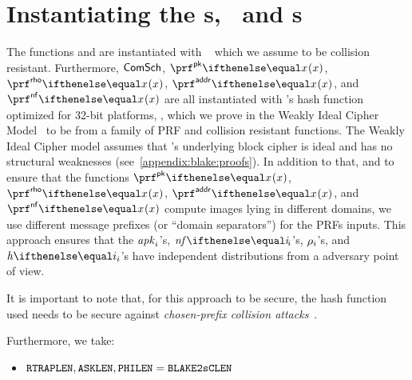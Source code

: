 
\section{Instantiating the \prf{}s, \comm~and \crh{}s}\label{instantiation:prf-comm-crh}


The functions \crhhsig{} and \crhots{} are instantiated with ~\cite{fips1804} which we assume to be collision resistant. Furthermore, $\mathsf{ComSch}$, $\prfpk{}{x}$, $\prfrho{}{x}$, $\prfaddr{}{x}$, and $\prfnf{}{x}$ are all instantiated with 's hash function optimized for 32-bit platforms, , which we prove in the Weakly Ideal Cipher Model~\cite{luykx2016security} to be from a family of PRF and collision resistant functions. The Weakly Ideal Cipher model assumes that 's underlying block cipher is ideal and has no structural weaknesses (see~\cref{appendix:blake:proofs}). In addition to that, and to ensure that the functions $\prfpk{}{x}$, $\prfrho{}{x}$, $\prfaddr{}{x}$, and $\prfnf{}{x}$ compute images lying in different domains, we use different message prefixes (or ``domain separators'') for the PRFs inputs. This approach ensures that the $\mathit{apk}_{i}$'s, $\nf{i}$'s, $\mathit{\rho}_{i}$'s, and $\htag{i}$'s have independent distributions from a \ppt{} adversary point of view.

\begin{notebox}
    It is important to note that, for this approach to be secure, the hash function used needs to be secure against \emph{chosen-prefix collision attacks}~\cite{md5-collision}.
\end{notebox}

Furthermore, we take:
\begin{itemize}
    \item $\mathtt{RTRAPLEN}, \mathtt{ASKLEN}, \mathtt{PHILEN} = \mathtt{BLAKE2sCLEN}$
\end{itemize}

